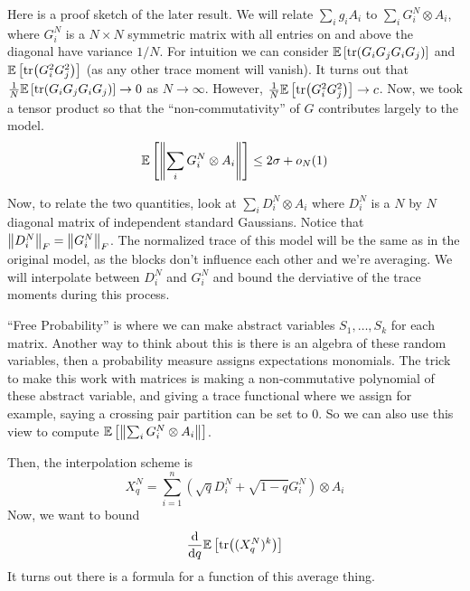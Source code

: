 Here is a proof sketch of the later result. We will relate $\sum_i g_i A_i$ to $\sum_i G_i^{N} \otimes A_i$,
where $G_i^N$ is a $N \times N$ symmetric matrix with all entries on and above the diagonal have variance $1/N$.
For intuition we can consider $\mathbb{E}\left[ \tr(G_i G_j G_i G_j) \right]$ and $\mathbb{E}\left[ \tr(G_i^2 G_j^2) \right]$ (as any other trace moment will vanish).
It turns out that $\frac{1}{N} \mathbb{E}\left[ \tr(G_i G_j G_i G_j) \right] \to 0$ as $N \to \infty$. However, $\frac{1}{N} \mathbb{E}\left[ \tr(G_i^2 G_j^2) \right] \to c$.
Now, we took a tensor product so that the ``non-commutativity'' of $G$ contributes largely to the model.
\[ \mathbb{E}\left[ \norm{\sum_i G_i^{N} \otimes A_i} \right] \le 2\sigma + o_N(1) \]

Now, to relate the two quantities, look at $\sum_i D_i^{N} \otimes A_i$
where $D_i^N$ is a $N$ by $N$ diagonal matrix of independent standard Gaussians. Notice that $\norm{D_i^N}_F = \norm{G_i^N}_F$.
The normalized trace of this model will be the same as in the original model, as the blocks don't influence each other and we're averaging.
We will interpolate between $D_i^N$ and $G_i^N$ and bound the derviative of the trace moments during this process.

``Free Probability'' is where we can make abstract variables $S_1, \dots, S_k$ for each matrix. Another way
to think about this is there is an algebra of these random variables, then a probability measure assigns expectations
monomials. The trick to make this work with matrices is making a non-commutative polynomial of these abstract variable,
and giving a trace functional where we assign for example, saying a crossing pair partition can be set to $0$. 
So we can also use this view to compute $\mathbb{E}\left[ \norm{\sum_i G_i^{N} \otimes A_i} \right]$.

Then, the interpolation scheme is
\[ X_q^N = \sum_{i = 1}^{n} (\sqrt{q} D_i^N + \sqrt{1 - q} G_i^N) \otimes A_i \]
Now, we want to bound
\[ \dv{}{q} \mathbb{E}\left[ \tr((X_q^N)^k) \right] \]
It turns out there is a formula for a function of this average thing.

